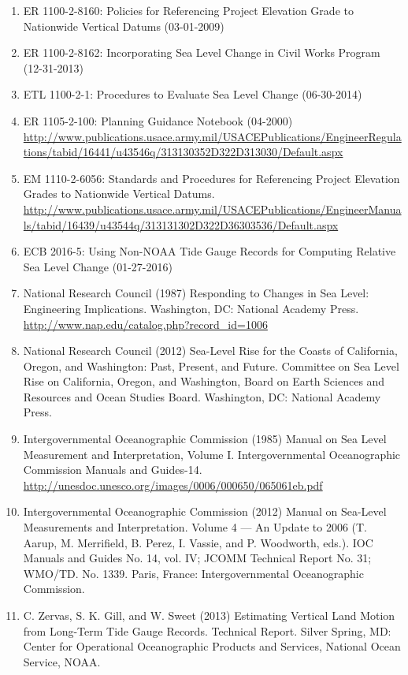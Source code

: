 \documentclass[10pt]{amsart}
\begin{document}
\begin{enumerate}
\item ER 1100-2-8160: Policies for Referencing Project Elevation Grade to Nationwide Vertical Datums (03-01-2009)
\item ER 1100-2-8162: Incorporating Sea Level Change in Civil Works Program (12-31-2013)
\item ETL 1100-2-1: Procedures to Evaluate Sea Level Change (06-30-2014)
\item ER 1105-2-100: Planning Guidance Notebook (04-2000) \url{http://www.publications.usace.army.mil/USACEPublications/EngineerRegulations/tabid/16441/u43546q/313130352D322D313030/Default.aspx}
\item EM 1110-2-6056: Standards and Procedures for Referencing Project Elevation Grades to Nationwide Vertical Datums. \url{http://www.publications.usace.army.mil/USACEPublications/EngineerManuals/tabid/16439/u43544q/313131302D322D36303536/Default.aspx}
\item ECB 2016-5: Using Non-NOAA Tide Gauge Records for Computing Relative Sea Level Change (01-27-2016)
\item National Research Council (1987) Responding to Changes in Sea Level: Engineering Implications. Washington, DC: National Academy Press. \url{http://www.nap.edu/catalog.php?record_id=1006}
\item National Research Council (2012) Sea-Level Rise for the Coasts of California, Oregon, and Washington: Past, Present, and Future. Committee on Sea Level Rise on California, Oregon, and Washington, Board on Earth Sciences and Resources and Ocean Studies Board. Washington, DC: National Academy Press.
\item Intergovernmental Oceanographic Commission (1985) Manual on Sea Level Measurement and Interpretation, Volume I. Intergovernmental Oceanographic Commission Manuals and Guides-14. \url{http://unesdoc.unesco.org/images/0006/000650/065061eb.pdf}
\item Intergovernmental Oceanographic Commission (2012) Manual on Sea-Level Measurements and Interpretation. Volume 4 — An Update to 2006 (T. Aarup, M. Merrifield, B. Perez, I. Vassie, and P. Woodworth, eds.). IOC Manuals and Guides No. 14, vol. IV; JCOMM Technical Report No. 31; WMO/TD. No. 1339. Paris, France: Intergovernmental Oceanographic Commission.
\item C. Zervas, S. K. Gill, and W. Sweet (2013) Estimating Vertical Land Motion from Long-Term Tide Gauge Records. Technical Report. Silver Spring, MD: Center for Operational Oceanographic Products and Services, National Ocean Service, NOAA.

\end{enumerate}
\end{document}
